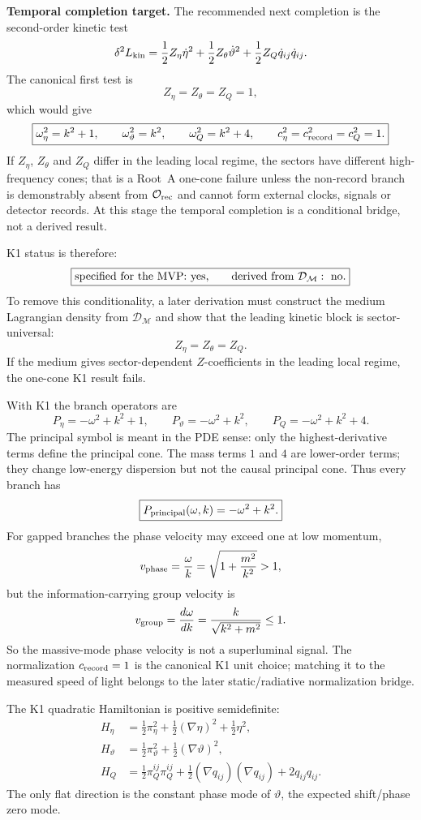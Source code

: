 \documentclass[11pt]{article}
\begin{document}
\medskip\noindent\textbf{Temporal completion target.}
The recommended next completion is the second-order kinetic test
\[
\delta^2L_{\rm kin}
=\frac12 Z_\eta\dot\eta^2
+\frac12 Z_\theta\dot\vartheta^2
+\frac12 Z_Q\dot q_{ij}\dot q_{ij}.
\]
The canonical first test is
\[
\boxed{Z_\eta=Z_\theta=Z_Q=1,}
\]
which would give
\[
\boxed{
\omega_\eta^2=k^2+1,\qquad
\omega_\vartheta^2=k^2,\qquad
\omega_Q^2=k^2+4,\qquad
c_\eta^2=c_{\rm record}^2=c_Q^2=1.
}
\]
If \(Z_\eta\), \(Z_\theta\) and \(Z_Q\) differ in the leading local regime,
the sectors have different high-frequency cones; that is a Root~A one-cone
failure unless the non-record branch is demonstrably absent from
\(\mathcal O_{\rm rec}\) and cannot form external clocks, signals or detector
records.  At this stage the temporal completion is a conditional bridge, not
a derived result.

K1 status is therefore:
\[
\boxed{
\text{specified for the MVP: yes,\qquad derived from }\mathcal D_{\mathcal M}:
\text{ no.}
}
\]
To remove this conditionality, a later derivation must construct the medium
Lagrangian density from \(\mathcal D_{\mathcal M}\) and show that the leading
kinetic block is sector-universal:
\[
\boxed{Z_\eta=Z_\theta=Z_Q.}
\]
If the medium gives sector-dependent \(Z\)-coefficients in the leading local
regime, the one-cone K1 result fails.

With K1 the branch operators are
\[
\boxed{
P_\eta=-\omega^2+k^2+1,\qquad
P_\vartheta=-\omega^2+k^2,\qquad
P_Q=-\omega^2+k^2+4.
}
\]
The principal symbol is meant in the PDE sense: only the highest-derivative
terms define the principal cone.  The mass terms \(1\) and \(4\) are
lower-order terms; they change low-energy dispersion but not the causal
principal cone.  Thus every branch has
\[
\boxed{
P_{\rm principal}(\omega,k)=-\omega^2+k^2.
}
\]
For gapped branches the phase velocity may exceed one at low momentum,
\[
v_{\rm phase}=\frac{\omega}{k}=\sqrt{1+\frac{m^2}{k^2}}>1,
\]
but the information-carrying group velocity is
\[
v_{\rm group}=\frac{d\omega}{dk}=\frac{k}{\sqrt{k^2+m^2}}\le 1.
\]
So the massive-mode phase velocity is not a superluminal signal.  The
normalization \(c_{\rm record}=1\) is the canonical K1 unit choice; matching it
to the measured speed of light belongs to the later static/radiative
normalization bridge.

The K1 quadratic Hamiltonian is positive semidefinite:
\[
\begin{aligned}
H_\eta&=\frac12\pi_\eta^2+\frac12(\nabla\eta)^2+\frac12\eta^2,\\
H_\vartheta&=\frac12\pi_\vartheta^2+\frac12(\nabla\vartheta)^2,\\
H_Q&=\frac12\pi_Q^{ij}\pi_Q^{ij}
  +\frac12(\nabla q_{ij})(\nabla q_{ij})+2q_{ij}q_{ij}.
\end{aligned}
\]
The only flat direction is the constant phase mode of \(\vartheta\), the
expected shift/phase zero mode.
\end{document}

